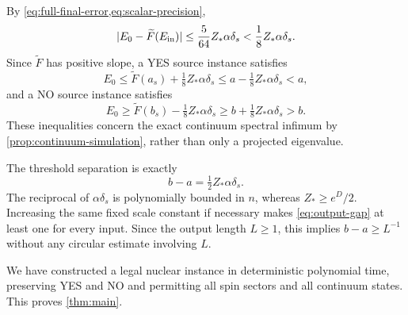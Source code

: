 By \cref{eq:full-final-error,eq:scalar-precision},
\begin{equation}\label{eq:rounded-affine-error}
|E_0-\widetilde F(E_{\rm in})|
\le \frac{5}{64}Z_*\alpha\delta_s
<\frac18Z_*\alpha\delta_s.
\end{equation}
Since $\widetilde F$ has positive slope, a YES source instance satisfies
\[
E_0\le\widetilde F(a_s)+\tfrac18Z_*\alpha\delta_s
\le a-\tfrac18Z_*\alpha\delta_s<a,
\]
and a NO source instance satisfies
\[
E_0\ge\widetilde F(b_s)-\tfrac18Z_*\alpha\delta_s
\ge b+\tfrac18Z_*\alpha\delta_s>b.
\]
These inequalities concern the exact continuum spectral infimum by \cref{prop:continuum-simulation}, rather than only a projected eigenvalue.

The threshold separation is exactly
\begin{equation}\label{eq:output-gap}
b-a=\tfrac12 Z_*\alpha\delta_s.
\end{equation}
The reciprocal of $\alpha\delta_s$ is polynomially bounded in $n$, whereas $Z_*\ge e^D/2$. Increasing the same fixed scale constant if necessary makes \cref{eq:output-gap} at least one for every input. Since the output length $L\ge1$, this implies $b-a\ge L^{-1}$ without any circular estimate involving $L$.

We have constructed a legal nuclear instance in deterministic polynomial time, preserving YES and NO and permitting all spin sectors and all continuum states. This proves \cref{thm:main}.
